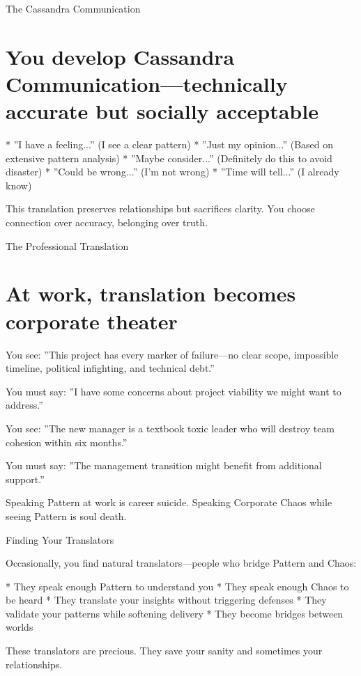 \documentclass[12pt,oneside]{book}
\begin{document}
The Cassandra Communication

\section{You develop Cassandra Communication---technically accurate but socially acceptable}

                    * ''I have a feeling...'' (I see a clear pattern)
                    * ''Just my opinion...'' (Based on extensive pattern analysis)
                    * ''Maybe consider...'' (Definitely do this to avoid disaster)
                    * ''Could be wrong...'' (I'm not wrong)
                    * ''Time will tell...'' (I already know)

This translation preserves relationships but sacrifices clarity. You choose connection over accuracy, belonging over truth.

The Professional Translation

\section{At work, translation becomes corporate theater}

You see: ''This project has every marker of failure---no clear scope, impossible timeline, political infighting, and technical debt.''

You must say: ''I have some concerns about project viability we might want to address.''

You see: ''The new manager is a textbook toxic leader who will destroy team cohesion within six months.''

You must say: ''The management transition might benefit from additional support.''

Speaking Pattern at work is career suicide. Speaking Corporate Chaos while seeing Pattern is soul death.

Finding Your Translators

Occasionally, you find natural translators---people who bridge Pattern and Chaos:

                    * They speak enough Pattern to understand you
                    * They speak enough Chaos to be heard
                    * They translate your insights without triggering defenses
                    * They validate your patterns while softening delivery
                    * They become bridges between worlds

These translators are precious. They save your sanity and sometimes your relationships.
\end{document}
